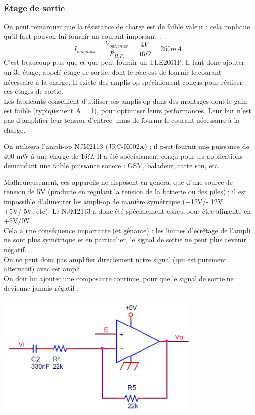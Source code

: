 \documentclass{../template/labo}
\begin{document}
\subsubsection{Étage de sortie}
On peut remarquer que la résistance de charge est de faible valeur ; cela implique qu'il faut pouvoir lui fournir un courant important :
$$I_{out,max}=\frac{V_{out,max}}{R_{H.P.}}=\frac{4V}{16\Omega}=250mA$$
C'est beaucoup plus que ce que peut fournir un TLE2061P. Il faut donc ajouter un 3e étage, appelé étage de sortie, dont le rôle est de fournir le courant nécessaire à la charge. Il existe des amplis-op spécialement conçus pour réaliser ces étages de sortie.\\
Les fabricants conseillent d'utiliser ces amplis-op dans des montages dont le gain est faible (typiquement A = 1), pour optimiser leurs performances. Leur but n'est pas d'amplifier leur tension d'entrée, mais de fournir le courant
nécessaire à la charge.

On utilisera l'ampli-op NJM2113 (JRC-K002A) ; il peut fournir une puissance de 400 mW à une charge de $16\Omega$. Il a été spécialement conçu pour les applications demandant une faible puissance sonore : GSM, baladeur, carte son, etc.

Malheureusement, ces appareils ne disposent en général que d'une source de tension de 5V (produite en régulant la tension de la batterie ou des piles) ; il est impossible d'alimenter les ampli-op de manière symétrique (+12V/- 12V, +5V/-5V, etc). Le NJM2113 a donc été spécialement conçu pour être alimenté en +5V/0V.\\
Cela a une conséquence importante (et gênante) : les limites d'écrêtage de l'ampli ne sont plus symétrique et en particulier, le signal de sortie ne peut plus devenir négatif.\\
On ne peut donc pas amplifier directement notre signal (qui est purement alternatif) avec cet ampli.\\
On doit lui ajouter une composante continue, pour que le signal de sortie ne devienne jamais négatif :
\begin{center}
\includegraphics[width=10cm]{figures/AOPetage3}
\end{center}
\end{document}
